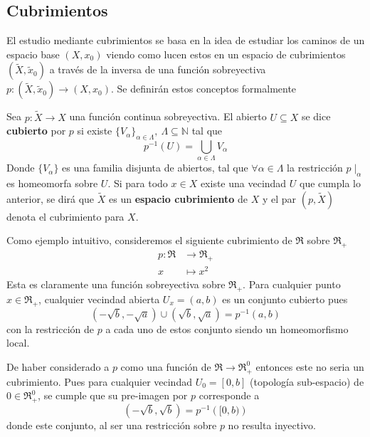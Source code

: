 \subsection{Cubrimientos}
El estudio mediante cubrimientos se basa en la idea de estudiar los
caminos de un espacio base \((X, x_0)\) viendo como lucen estos en
un espacio de cubrimientos \((\tilde X, \tilde x_0)\) a través de la
inversa de una función sobreyectiva \(p : \left( \tilde X, \tilde x_0
\right) \to \left( X, x_0\right)\). Se definirán estos conceptos formalmente
\begin{definicion} \label{def:cubierta}
Sea \(p : \tilde{X} \to X\) una función continua sobreyectiva. El
abierto \(U \subseteq X\) se dice \textbf{cubierto} por \(p\)
si existe \(\{V_\alpha\}_{\alpha \in \Lambda},\ \Lambda \subseteq
\mathbb N\) tal que
\[ p^{-1} (U) = \bigcup_{\alpha \in \Lambda} V_\alpha \]
Donde \(\{V_\alpha\}\) es una familia disjunta de abiertos, tal que
\(\forall \alpha \in \Lambda\) la restricción \( p \mid_{\alpha}\) es
homeomorfa sobre \(U\). Si para todo \(x \in X\) existe una vecindad
\(U\) que cumpla lo anterior, se dirá que \(\tilde{X}\) es un
\textbf{espacio cubrimiento} de \(X\) y el par \((p,\tilde X)\) denota
el cubrimiento para \(X\).
\end{definicion}

\begin{ejemplo}
  Como ejemplo intuitivo, consideremos el siguiente cubrimiento de
  \(\Re\) sobre \(\Re_+\)
  \begin{align*}
    p : \Re &\longrightarrow \Re_+ \\
    x &\longmapsto x^2
  \end{align*}
  Esta es claramente una función sobreyectiva sobre \(\Re_+\). Para
  cualquier punto \(x \in \Re_+\), cualquier vecindad abierta \(U_x =
  (a, b)\) es un conjunto cubierto pues
  \[ \left( - \sqrt b , - \sqrt a \right) \cup \left( \sqrt b , \sqrt a
    \right) = p^{-1} \left( a , b \right) \]
  con la restricción de \(p\) a cada uno de estos conjunto siendo un
  homeomorfismo local.

  De haber considerado a \(p\) como una función de \(\Re \to \Re_+^0\)
  entonces este no seria un cubrimiento. Pues para cualquier vecindad
  \(U_0 = [0, b]\) (topología sub-espacio) de \(0 \in \Re_+^0\), se
  cumple que su pre-imagen por \(p\) corresponde a
  \[ (- \sqrt b, \sqrt b) = p^{-1} \left( [0, b) \right) \]
  donde este conjunto, al ser una restricción sobre \(p\) no resulta
  inyectivo.

\end{ejemplo}

